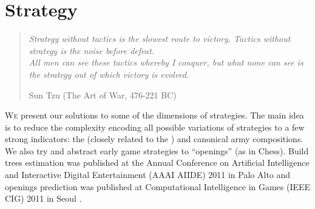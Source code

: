 \chapter{Strategy}
\label{chapter:strategy}
\begin{quotation}
\textit{Strategy without tactics is the slowest route to victory. Tactics without strategy is the noise before defeat.}\\
\textit{All men can see these tactics whereby I conquer, but what none can see is the strategy out of which victory is evolved.}\\
\begin{flushright}Sun Tzu (The Art of War, 476-221 BC)\end{flushright}
\end{quotation}

\lettrine{W}e present our solutions to some of the dimensions of strategies. The main idea is to reduce the complexity encoding all possible variations of strategies to a few strong indicators: the  (closely related to the ) and canonical army compositions. We also try and abstract early game strategies to ``openings'' (as in Chess). Build trees estimation was published at the Annual Conference on Artificial Intelligence and Interactive Digital Entertainment (AAAI AIIDE) 2011 in Palo Alto \citep{SYNNAEVE:StratPred} and openings prediction was published at Computational Intelligence in Games (IEEE CIG) 2011 in Seoul \citep{SYNNAEVE:OpeningPred}.





